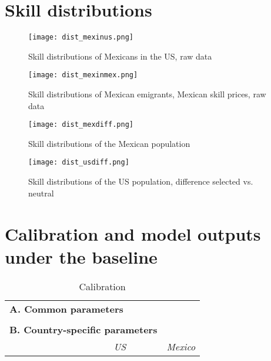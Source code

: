 \documentclass[11pt, a4paper]{article}
\begin{document}

\section{Skill distributions}


\begin{figure}
\centering
\texttt{[image: dist\_mexinus.png]}
\caption{Skill distributions of Mexicans in the US, raw data}
\end{figure}


\begin{figure}
\centering
\texttt{[image: dist\_mexinmex.png]}
\caption{Skill distributions of Mexican emigrants, Mexican skill prices, raw data}
\end{figure}


\begin{figure}
\centering
\texttt{[image: dist\_mexdiff.png]}
\caption{Skill distributions of the Mexican population}
\end{figure}

\begin{figure}
\centering
\texttt{[image: dist\_usdiff.png]}
\caption{Skill distributions of the US population, difference selected vs. neutral}
\end{figure}




\section{Calibration and model outputs under the baseline}

\begin{table}[h]
\begin{center}
\caption{Calibration}
\begin{tabular}{lccc}
\hline \hline
\multicolumn{3}{l}{\textbf{A. Common parameters}} \\

\\
\multicolumn{3}{l}{\textbf{B. Country-specific parameters}} \\
&& \textit{US} & \textit{Mexico} \\
\cline{3-4}

\hline
\end{tabular}
\end{center}
\end{table}
\end{document}
